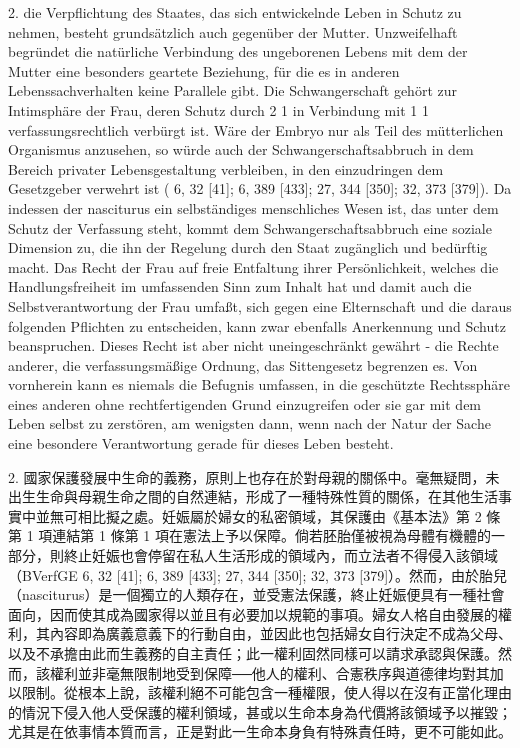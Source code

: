 \documentclass[12pt]{article}
\begin{document}
\syncleft
\begin{sourcepara}
2. die Verpflichtung des Staates, das sich entwickelnde Leben in Schutz zu nehmen, besteht grundsätzlich auch gegenüber der Mutter. Unzweifelhaft begründet die natürliche Verbindung des ungeborenen Lebens mit dem der Mutter eine besonders geartete Beziehung, für die es in anderen Lebenssachverhalten keine Parallele gibt. Die Schwangerschaft gehört zur Intimsphäre der Frau, deren Schutz durch \abbrArt{} 2 \abbrAbs{} 1 in Verbindung mit \abbrArt{} 1 \abbrAbs{} 1 \abbrGG{} verfassungsrechtlich verbürgt ist. Wäre der Embryo nur als Teil des mütterlichen Organismus anzusehen, so würde auch der Schwangerschaftsabbruch in dem Bereich privater Lebensgestaltung verbleiben, in den einzudringen dem Gesetzgeber verwehrt ist (\abbrBVerfGE{} 6, 32 [41]; 6, 389 [433]; 27, 344 [350]; 32, 373 [379]). Da indessen der nasciturus ein selbständiges menschliches Wesen ist, das unter dem Schutz der Verfassung steht, kommt dem Schwangerschaftsabbruch eine soziale Dimension zu, die ihn der Regelung durch den Staat zugänglich und bedürftig macht. Das Recht der Frau auf freie Entfaltung ihrer Persönlichkeit, welches die Handlungsfreiheit im umfassenden Sinn zum Inhalt hat und damit auch die Selbstverantwortung der Frau umfaßt, sich gegen eine Elternschaft und die daraus folgenden Pflichten zu entscheiden, kann zwar ebenfalls Anerkennung und Schutz beanspruchen. Dieses Recht ist aber nicht uneingeschränkt gewährt - die Rechte anderer, die verfassungsmäßige Ordnung, das Sittengesetz begrenzen es. Von vornherein kann es niemals die Befugnis umfassen, in die geschützte Rechtssphäre eines anderen ohne rechtfertigenden Grund einzugreifen oder sie gar mit dem Leben selbst zu zerstören, am wenigsten dann, wenn nach der Natur der Sache eine besondere Verantwortung gerade für dieses Leben besteht.
\end{sourcepara}
\begin{transpara}
2. 國家保護發展中生命的義務，原則上也存在於對母親的關係中。毫無疑問，未出生生命與母親生命之間的自然連結，形成了一種特殊性質的關係，在其他生活事實中並無可相比擬之處。妊娠屬於婦女的私密領域，其保護由《基本法》第 2 條第 1 項連結第 1 條第 1 項在憲法上予以保障。倘若胚胎僅被視為母體有機體的一部分，則終止妊娠也會停留在私人生活形成的領域內，而立法者不得侵入該領域（BVerfGE 6, 32 [41]; 6, 389 [433]; 27, 344 [350]; 32, 373 [379]）。然而，由於胎兒（nasciturus）是一個獨立的人類存在，並受憲法保護，終止妊娠便具有一種社會面向，因而使其成為國家得以並且有必要加以規範的事項。婦女人格自由發展的權利，其內容即為廣義意義下的行動自由，並因此也包括婦女自行決定不成為父母、以及不承擔由此而生義務的自主責任；此一權利固然同樣可以請求承認與保護。然而，該權利並非毫無限制地受到保障──他人的權利、合憲秩序與道德律均對其加以限制。從根本上說，該權利絕不可能包含一種權限，使人得以在沒有正當化理由的情況下侵入他人受保護的權利領域，甚或以生命本身為代價將該領域予以摧毀；尤其是在依事情本質而言，正是對此一生命本身負有特殊責任時，更不可能如此。
\end{transpara}
\end{document}
